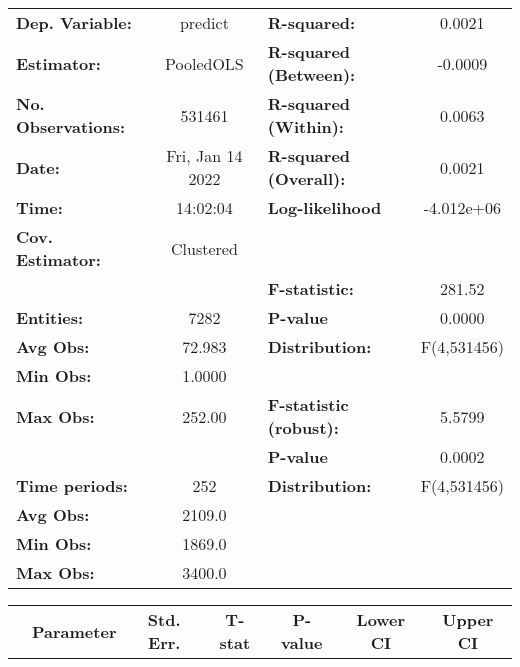 \begin{center}
\begin{tabular}{lclc}
\toprule
\textbf{Dep. Variable:}    &      predict       & \textbf{  R-squared:         }   &      0.0021      \\
\textbf{Estimator:}        &     PooledOLS      & \textbf{  R-squared (Between):}  &     -0.0009      \\
\textbf{No. Observations:} &       531461       & \textbf{  R-squared (Within):}   &      0.0063      \\
\textbf{Date:}             &  Fri, Jan 14 2022  & \textbf{  R-squared (Overall):}  &      0.0021      \\
\textbf{Time:}             &      14:02:04      & \textbf{  Log-likelihood     }   &    -4.012e+06    \\
\textbf{Cov. Estimator:}   &     Clustered      & \textbf{                     }   &                  \\
\textbf{}                  &                    & \textbf{  F-statistic:       }   &      281.52      \\
\textbf{Entities:}         &        7282        & \textbf{  P-value            }   &      0.0000      \\
\textbf{Avg Obs:}          &       72.983       & \textbf{  Distribution:      }   &   F(4,531456)    \\
\textbf{Min Obs:}          &       1.0000       & \textbf{                     }   &                  \\
\textbf{Max Obs:}          &       252.00       & \textbf{  F-statistic (robust):} &      5.5799      \\
\textbf{}                  &                    & \textbf{  P-value            }   &      0.0002      \\
\textbf{Time periods:}     &        252         & \textbf{  Distribution:      }   &   F(4,531456)    \\
\textbf{Avg Obs:}          &       2109.0       & \textbf{                     }   &                  \\
\textbf{Min Obs:}          &       1869.0       & \textbf{                     }   &                  \\
\textbf{Max Obs:}          &       3400.0       & \textbf{                     }   &                  \\
\bottomrule
\end{tabular}
\begin{tabular}{lcccccc}
                & \textbf{Parameter} & \textbf{Std. Err.} & \textbf{T-stat} & \textbf{P-value} & \textbf{Lower CI} & \textbf{Upper CI}  \\

\end{tabular}
\end{center}

